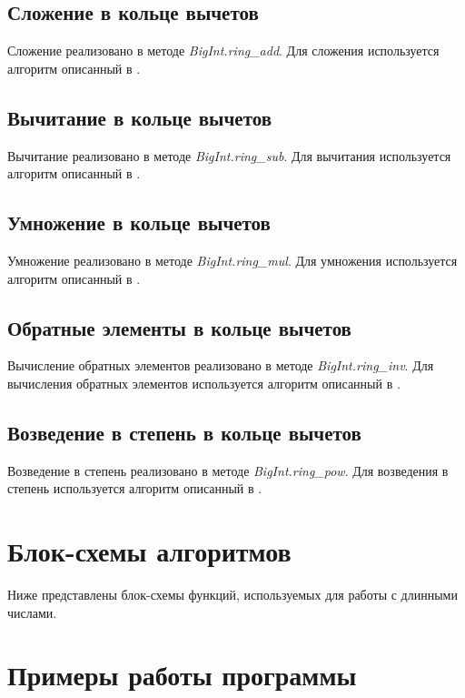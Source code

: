 \subsection{Сложение в кольце вычетов}
Сложение реализовано в методе \textit{BigInt.ring\_add}. Для сложения используется алгоритм описанный в \cite{zavg}.

\subsection{Вычитание в кольце вычетов}
Вычитание реализовано в методе \textit{BigInt.ring\_sub}. Для вычитания используется алгоритм описанный в \cite{zavg}.

\subsection{Умножение в кольце вычетов}
Умножение реализовано в методе \textit{BigInt.ring\_mul}. Для умножения используется алгоритм описанный в \cite{zavg}.

\subsection{Обратные элементы в кольце вычетов}
Вычисление обратных элементов реализовано в методе \textit{BigInt.ring\_inv}. Для вычисления обратных элементов используется алгоритм описанный в \cite{zavg}.

\subsection{Возведение в степень в кольце вычетов}
Возведение в степень реализовано в методе \textit{BigInt.ring\_pow}. Для возведения в степень используется алгоритм описанный в \cite{zavg}.

\section{Блок-схемы алгоритмов}
Ниже представлены блок-схемы функций, используемых для работы с длинными числами.











\clearpage

\section{Примеры работы программы}

